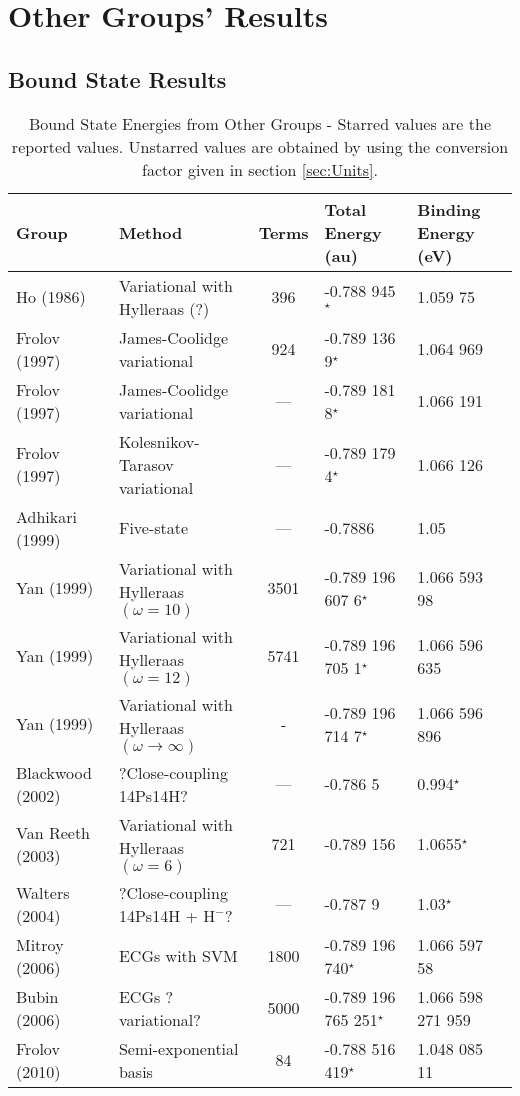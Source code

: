 \documentclass[Dissertation.tex]{subfiles}
\begin{document}
\section{Other Groups' Results}
\subsection{Bound State Results}
\begin{table}[H]
\begin{center}
\begin{tabular}{l l c l l}
\toprule
Group & Method & Terms & Total Energy (au) & Binding Energy (eV)\\
\midrule
Ho (1986) \cite{Ho1986} & Variational with Hylleraas (?) & 396 & -0.788 945$^\star$ & 1.059 75 \\
Frolov (1997) \cite{Frolov1997a} & James-Coolidge variational & 924 & -0.789 136 9$^\star$ & 1.064 969 \\
Frolov (1997) \cite{Frolov1997a} & James-Coolidge variational & --- & -0.789 181 8$^\star$ & 1.066 191 \\
Frolov (1997) \cite{Frolov1997b} & Kolesnikov-Tarasov variational & --- & -0.789 179 4$^\star$ & 1.066 126 \\
Adhikari (1999) \cite{Adhikari1999} & Five-state & --- & -0.7886 & 1.05 \\
Yan (1999) \cite{Yan1999} & Variational with Hylleraas $(\omega = 10)$ & 3501 & -0.789 196 607 6$^\star$ & 1.066 593 98 \\
Yan (1999) \cite{Yan1999} & Variational with Hylleraas $(\omega = 12)$ & 5741 & -0.789 196 705 1$^\star$ & 1.066 596 635 \\
Yan (1999) \cite{Yan1999} & Variational with Hylleraas $(\omega \rightarrow \infty)$ & - & -0.789 196 714 7$^\star$ & 1.066 596 896 \\
Blackwood (2002) \cite{Blackwood2002} & ?Close-coupling 14Ps14H? & --- & -0.786 5 & 0.994$^\star$ \\
Van Reeth (2003) \cite{VanReeth2003} & Variational with Hylleraas $(\omega = 6)$ & 721 & -0.789 156 & 1.0655$^\star$ \\
Walters (2004) \cite{Walters2004} & ?Close-coupling 14Ps14H + $\text{H}^-$? & --- & -0.787 9 & 1.03$^\star$\\
Mitroy (2006) \cite{Mitroy2006} & ECGs with SVM & 1800 & -0.789 196 740$^\star$ & 1.066 597 58 \\
Bubin (2006) \cite{Bubin2006} & ECGs ?variational? & 5000 & -0.789 196 765 251$^\star$ & 1.066 598 271 959 \\
Frolov (2010) \cite{Frolov2010} & Semi-exponential basis & 84 & -0.788 516 419$^\star$ & 1.048 085 11 \\
\bottomrule
\end{tabular}
\caption{Bound State Energies from Other Groups - Starred values are the reported values.  Unstarred values are obtained by using the conversion factor given in section \ref{sec:Units}.}
\label{tab:BoundEnergyOther}
\end{center}
\end{table}
\end{document}
